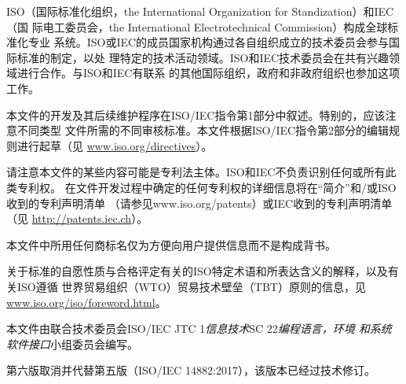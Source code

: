 ISO（国际标准化组织，the International Organization for Standization）和IEC（国
际电工委员会，the International Electrotechnical Commission）构成全球标准化专业
系统。ISO或IEC的成员国家机构通过各自组织成立的技术委员会参与国际标准的制定，以处
理特定的技术活动领域。ISO和IEC技术委员会在共有兴趣领域进行合作。与ISO和IEC有联系
的其他国际组织，政府和非政府组织也参加这项工作。

本文件的开发及其后续维护程序在ISO/IEC指令第1部分中叙述。特别的，应该注意不同类型
文件所需的不同审核标准。本文件根据ISO/IEC指令第2部分的编辑规则进行起草（见
\href{https://www.iso.org/directives}{www.iso.org/directives}）。

请注意本文件的某些内容可能是专利法主体。ISO和IEC不负责识别任何或所有此类专利权。
在文件开发过程中确定的任何专利权的详细信息将在“简介”和/或ISO收到的专利声明清单
（请参见www.iso.org/patents）或IEC收到的专利声明清单（见
\href{http://patents.iec.ch}{http://patents.iec.ch}）。

本文件中所用任何商标名仅为方便向用户提供信息而不是构成背书。

关于标准的自愿性质与合格评定有关的ISO特定术语和所表达含义的解释，以及有关ISO遵循
世界贸易组织（WTO）贸易技术壁垒（TBT）原则的信息，见
\href{www.iso.org/iso/foreword.html}{www.iso.org/iso/foreword.html}。

本文件由联合技术委员会ISO/IEC JTC 1\textit{信息技术}SC 22\textit{编程语言，环境
和系统软件接口}小组委员会编写。

第六版取消并代替第五版（ISO/IEC 14882:2017），该版本已经过技术修订。

